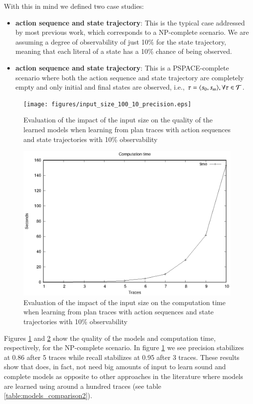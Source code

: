 With this in mind we defined two case studies:
\begin{itemize}
	\item \textbf{\FO action sequence and \PO state trajectory}: This is the typical case addressed by most previous work, which corresponds to a NP-complete scenario. We are assuming a degree of observability of just 10\% for the state trajectory, meaning that each literal of a state has a 10\% chance of being observed.
	\item  \textbf{\NO action sequence and \NO state trajectory}: This is a PSPACE-complete scenario where both the action sequence and state trajectory are completely empty and only initial and final states are observed, i.e., $\tau = {\langle s_0, s_m \rangle}, \forall \tau \in \mathcal{T}$.
\end{itemize}

\begin{figure}[hbt!]
	\centering
	\texttt{[image: figures/input\_size\_100\_10\_precision.eps]}
	\caption{Evaluation of the impact of the input size on the quality of the learned models when learning from plan traces with \FO action sequences and \PO state trajectories with 10\% observability}
	\label{fig:np_quality}
\end{figure}

\begin{figure}[hbt!]
	\centering
	\includegraphics[width=0.8\linewidth]{figures/input_size_100_10_time.eps}
	\caption{Evaluation of the impact of the input size on the computation time when learning from plan traces with \FO action sequences and \PO state trajectories with 10\% observability}
	\label{fig:np_time}
\end{figure}

Figures \ref{fig:np_quality} and \ref{fig:np_time} show the quality of the models and computation time, respectively, for the NP-complete scenario. In figure \ref{fig:np_quality} we see precision stabilizes at 0.86 after 5 traces while recall stabilizes at 0.95 after 3 traces. These results show that \FAMA does, in fact, not need big amounts of input to learn sound and complete models as opposite to other approaches in the literature where models are learned using around a hundred traces (see table \ref{table:models_comparison2}).


